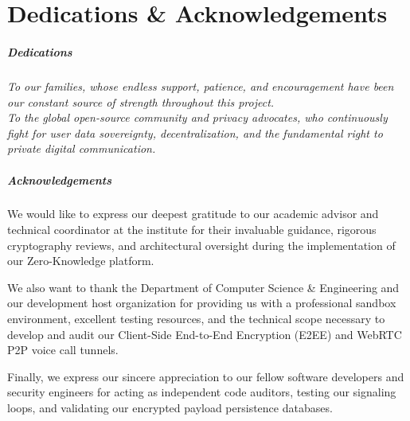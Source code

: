 
\chapter*{Dedications \& Acknowledgements}

\paragraph{Dedications}
\begin{center}
    \emph{To our families, whose endless support, patience, and encouragement have been our constant source of strength throughout this project.}\\
    \vspace{0.8cm}
    \emph{To the global open-source community and privacy advocates, who continuously fight for user data sovereignty, decentralization, and the fundamental right to private digital communication.}
\end{center}

\vspace{2cm}

\paragraph{Acknowledgements}
\begin{center}
We would like to express our deepest gratitude to our academic advisor and technical coordinator at the institute for their invaluable guidance, rigorous cryptography reviews, and architectural oversight during the implementation of our Zero-Knowledge platform.

We also want to thank the Department of Computer Science \& Engineering and our development host organization for providing us with a professional sandbox environment, excellent testing resources, and the technical scope necessary to develop and audit our Client-Side End-to-End Encryption (E2EE) and WebRTC P2P voice call tunnels.

Finally, we express our sincere appreciation to our fellow software developers and security engineers for acting as independent code auditors, testing our signaling loops, and validating our encrypted payload persistence databases.
\end{center}